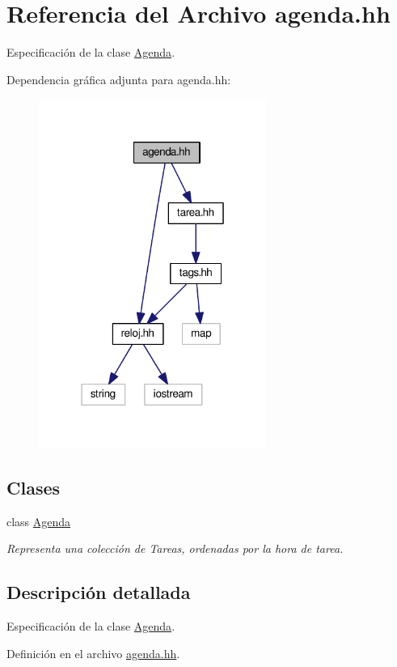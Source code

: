 \hypertarget{agenda_8hh}{\section{Referencia del Archivo agenda.\-hh}
\label{agenda_8hh}
}


Especificación de la clase \hyperlink{class_agenda}{Agenda}.  


Dependencia gráfica adjunta para agenda.\-hh\-:
\nopagebreak
\begin{figure}[H]
\begin{center}
\leavevmode
\includegraphics[width=211pt]{agenda_8hh__incl}
\end{center}
\end{figure}
\subsection*{Clases}
\begin{DoxyCompactItemize}
\item 
class \hyperlink{class_agenda}{Agenda}
\begin{DoxyCompactList}\small\item\em Representa una colección de Tareas, ordenadas por la hora de tarea. \end{DoxyCompactList}\end{DoxyCompactItemize}


\subsection{Descripción detallada}
Especificación de la clase \hyperlink{class_agenda}{Agenda}. 

Definición en el archivo \hyperlink{agenda_8hh_source}{agenda.\-hh}.


